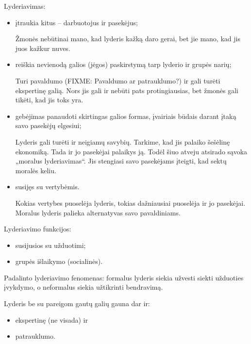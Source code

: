 Lyderiavimas:
\begin{itemize}
  \item įtraukia kitus – darbuotojus ir pasekėjus;
    \begin{note}
      Žmonės nebūtinai mano, kad lyderis kažką daro gerai, bet jie mano,
      kad jis juos kažkur nuves.
    \end{note}
  \item reiškia nevienodą galios (jėgos) paskirstymą tarp lyderio ir
    grupės narių;
    \begin{note}
      Turi pavaldumo (FIXME: Pavaldumo ar patrauklumo?) ir gali turėti
      ekspertinę galią. Nors jis gali ir nebūti pats protingiausias,
      bet žmonės gali tikėti, kad jis toks yra.
    \end{note}
  \item gebėjimas panaudoti skirtingas galios formas, įvairiais būdais
    darant įtaką savo pasekėjų elgesiui;
    \begin{note}
      Lyderis gali turėti ir neigiamų savybių. Tarkime, kad jis palaiko
      šešėlinę ekonomiką. Tada ir jo pasekėjai palaikys ją. Todėl šiuo
      atveju atsirado sąvoka „moralus lyderiavimas“. Jis stengiasi
      savo pasekėjams įteigti, kad sektų moralės keliu.
    \end{note}
  \item susijęs su vertybėmis.
    \begin{note}
      Kokias vertybes puoselėja lyderis, tokias dažniausiai puoselėja
      ir jo pasekėjai. Moralus lyderis palieka alternatyvas savo
      pavaldiniams.
    \end{note}
\end{itemize}

Lyderiavimo funkcijos:
\begin{itemize}
  \item susijusios su užduotimi;
  \item grupės išlaikymo (socialinės).
\end{itemize}

Padalinto lyderiavimo fenomenas: formalus lyderis siekia užvesti siekti
užduoties įvykdymo, o neformalus siekia užtikrinti bendravimą.

Lyderis be su pareigom gautų galių gauna dar ir:
\begin{itemize}
  \item ekspertinę (ne visada) ir
  \item patrauklumo.
\end{itemize}

